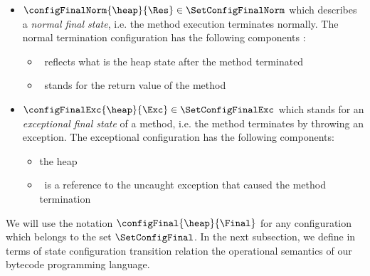  \begin{itemize}
        \item  $\configFinalNorm{\heap}{\Res} \in \SetConfigFinalNorm $ which describes a \textit{normal final state}, i.e.
	       the method execution terminates normally. The normal termination configuration has the following components :
               \begin{itemize}
                      \item \heap \ reflects what is the heap state after the method terminated 
		      \item \Res \ stands for the return value  of the method
	       \end{itemize}

	\item  $\configFinalExc{\heap}{\Exc} \in \SetConfigFinalExc $ which stands for an \textit{exceptional final state} of a method,
	       i.e. the method terminates by throwing an exception. The exceptional configuration has the following components:
               \begin{itemize}
                      \item the heap \heap 
		      \item \Exc \ is a reference to the uncaught exception that caused the method termination
               \end{itemize}

 \end{itemize}
  
 We will use the notation $\configFinal{\heap}{\Final}$ for any configuration which belongs to the set  $\SetConfigFinal$. 
 In the next subsection, we define in terms of state configuration transition relation the operational semantics of
 our bytecode programming language.
 
